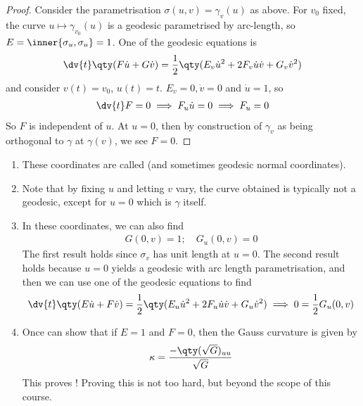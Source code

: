 \begin{proof}
	Consider the parametrisation $\sigma(u,v) = \gamma_v(u)$ as above.
	For $v_0$ fixed, the curve $u \mapsto \gamma_{v_0}(u)$ is a geodesic parametrised by arc-length, so $E = \inner{\sigma_u, \sigma_u} = 1$.
	One of the geodesic equations is
	\begin{align*}
		\dv{t} \qty(F \dot u + G \dot v) = \frac{1}{2} \qty(E_v \dot u^2 + 2F_v \dot u \dot v + G_v \dot v^2)
	\end{align*}
	and consider $v(t) = v_0$, $u(t) = t$.
	$E_v = 0, \dot v = 0$ and $\dot u = 1$, so
	\begin{align*}
		\dv{t} F = 0 \implies F_u \dot u = 0 \implies F_u = 0
	\end{align*}
	So $F$ is independent of $u$.
	At $u = 0$, then by construction of $\gamma_v$ as being orthogonal to $\gamma$ at $\gamma(v)$, we see $F = 0$.
\end{proof}

\begin{remark}
	\begin{enumerate}
		\item These coordinates are called  (and sometimes geodesic normal coordinates).
		\item Note that by fixing $u$ and letting $v$ vary, the curve obtained is typically not a geodesic, except for $u = 0$ which is $\gamma$ itself.
		\item In these coordinates, we can also find
		\begin{align*}
			G(0,v) = 1;\quad G_u(0,v) = 0
		\end{align*}
		The first result holds since $\sigma_v$ has unit length at $u = 0$.
		The second result holds because $u = 0$ yields a geodesic with arc length parametrisation, and then we can use one of the geodesic equations to find
		\begin{align*}
			\dv{t} \qty(E \dot u + F \dot v) = \frac{1}{2}\qty(E_u \dot u^2 + 2F_u \dot u \dot v + G_u \dot v^2) \implies 0 = \frac{1}{2} G_u(0,v)
		\end{align*}
		\item Once can show that if $E = 1$ and $F = 0$, then the Gauss curvature is given by
		\begin{align*}
			\kappa = \frac{-\qty(\sqrt{G})_{uu}}{\sqrt{G}}
		\end{align*}
		This proves !
		Proving this is not too hard, but beyond the scope of this course.
	\end{enumerate} 
\end{remark} 


